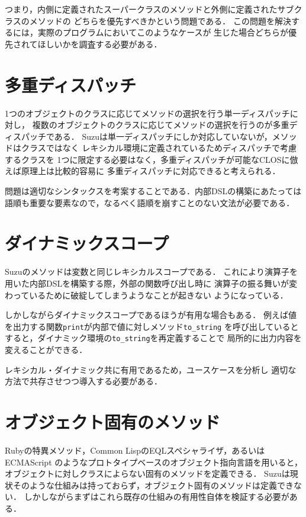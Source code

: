 \documentclass[a4paper,11pt,dvipdfmx]{jreport}
\begin{document}
つまり，内側に定義されたスーパークラスのメソッドと外側に定義されたサブクラスのメソッドの
どちらを優先すべきかという問題である．
この問題を解決するには，実際のプログラムにおいてこのようなケースが
生じた場合どちらが優先されてほしいかを調査する必要がある．


\section{多重ディスパッチ}

1つのオブジェクトのクラスに応じてメソッドの選択を行う単一ディスパッチに対し，
複数のオブジェクトのクラスに応じてメソッドの選択を行うのが多重ディスパッチである．
Suzuは単一ディスパッチにしか対応していないが，メソッドはクラスではなく
レキシカル環境に定義されているためディスパッチで考慮するクラスを
1つに限定する必要はなく，多重ディスパッチが可能なCLOSに倣えば原理上は比較的容易に
多重ディスパッチに対応できると考えられる．

問題は適切なシンタックスを考案することである．内部DSLの構築にあたっては
語順も重要な要素なので，なるべく語順を崩すことのない文法が必要である．

\section{ダイナミックスコープ}

Suzuのメソッドは変数と同じレキシカルスコープである．
これにより演算子を用いた内部DSLを構築する際，外部の関数呼び出し時に
演算子の振る舞いが変わっているために破綻してしまうようなことが起きない
ようになっている．

しかしながらダイナミックスコープであるほうが有用な場合もある．
例えば値を出力する関数\verb|print|が内部で値に対しメソッド\verb|to_string|
を呼び出しているとすると，ダイナミック環境の\verb|to_string|を再定義することで
局所的に出力内容を変えることができる．

レキシカル・ダイナミック共に有用であるため，ユースケースを分析し
適切な方法で共存させつつ導入する必要がある．

\section{オブジェクト固有のメソッド}

Rubyの特異メソッド，Common LispのEQLスペシャライザ，あるいはECMAScript
\cite{ECMAScript}のようなプロトタイプベースのオブジェクト指向言語を用いると，
オブジェクトに対しクラスによらない固有のメソッドを定義できる．
Suzuは現状そのような仕組みは持っておらず，オブジェクト固有のメソッドは定義できない．
しかしながらまずはこれら既存の仕組みの有用性自体を検証する必要がある．
\end{document}
